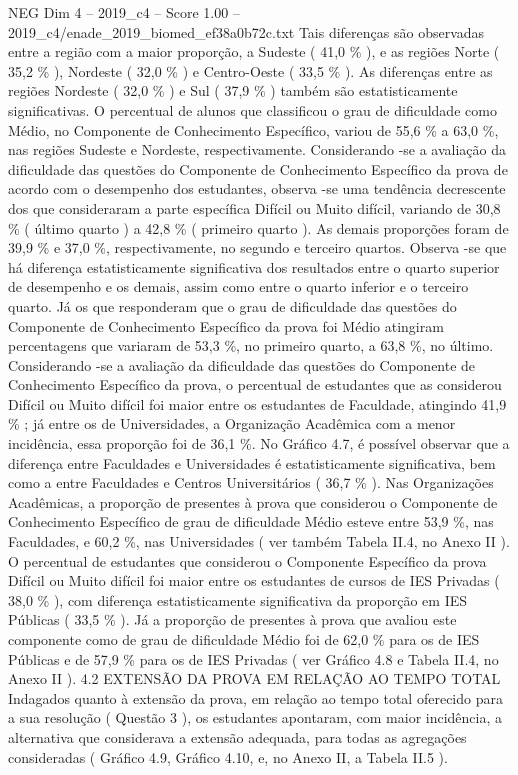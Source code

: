 \begin{textsample}{NEG Dim 4 – 2019\_c4 – Score 1.00 – 2019\_c4/enade\_2019\_biomed\_ef38a0b72c.txt}
Tais diferenças são observadas entre a região com a maior proporção, a Sudeste ( 41,0 \% ), e as regiões Norte ( 35,2 \% ), Nordeste ( 32,0 \% ) e Centro-Oeste ( 33,5 \% ).
As diferenças entre as regiões Nordeste ( 32,0 \% ) e Sul ( 37,9 \% ) também são estatisticamente significativas.
O percentual de alunos que classificou o grau de dificuldade como Médio, no Componente de Conhecimento Específico, variou de 55,6 \% a 63,0 \%, nas regiões Sudeste e Nordeste, respectivamente.
Considerando -se a avaliação da dificuldade das questões do Componente de Conhecimento Específico da prova de acordo com o desempenho dos estudantes, observa -se uma tendência decrescente dos que consideraram a parte específica Difícil ou Muito difícil, variando de 30,8 \% ( último quarto ) a 42,8 \% ( primeiro quarto ).
As demais proporções foram de 39,9 \% e 37,0 \%, respectivamente, no segundo e terceiro quartos.
Observa -se que há diferença estatisticamente significativa dos resultados entre o quarto superior de desempenho e os demais, assim como entre o quarto inferior e o terceiro quarto.
Já os que responderam que o grau de dificuldade das questões do Componente de Conhecimento Específico da prova foi Médio atingiram percentagens que variaram de 53,3 \%, no primeiro quarto, a 63,8 \%, no último.
Considerando -se a avaliação da dificuldade das questões do Componente de Conhecimento Específico da prova, o percentual de estudantes que as considerou Difícil ou Muito difícil foi maior entre os estudantes de Faculdade, atingindo 41,9 \% ; já entre os de Universidades, a Organização Acadêmica com a menor incidência, essa proporção foi de 36,1 \%.
No Gráfico 4.7, é possível observar que a diferença entre Faculdades e Universidades é estatisticamente significativa, bem como a entre Faculdades e Centros Universitários ( 36,7 \% ).
Nas Organizações Acadêmicas, a proporção de presentes à prova que considerou o Componente de Conhecimento Específico de grau de dificuldade Médio esteve entre 53,9 \%, nas Faculdades, e 60,2 \%, nas Universidades ( ver também Tabela II.4, no Anexo II ).
O percentual de estudantes que considerou o Componente Específico da prova Difícil ou Muito difícil foi maior entre os estudantes de cursos de IES Privadas ( 38,0 \% ), com diferença estatisticamente significativa da proporção em IES Públicas ( 33,5 \% ).
Já a proporção de presentes à prova que avaliou este componente como de grau de dificuldade Médio foi de 62,0 \% para os de IES Públicas e de 57,9 \% para os de IES Privadas ( ver Gráfico 4.8 e Tabela II.4, no Anexo II ). 4.2 EXTENSÃO DA PROVA EM RELAÇÃO AO TEMPO TOTAL Indagados quanto à extensão da prova, em relação ao tempo total oferecido para a sua resolução ( Questão 3 ), os estudantes apontaram, com maior incidência, a alternativa que considerava a extensão adequada, para todas as agregações consideradas ( Gráfico 4.9, Gráfico 4.10, e, no Anexo II, a Tabela II.5 ).

\end{textsample}
